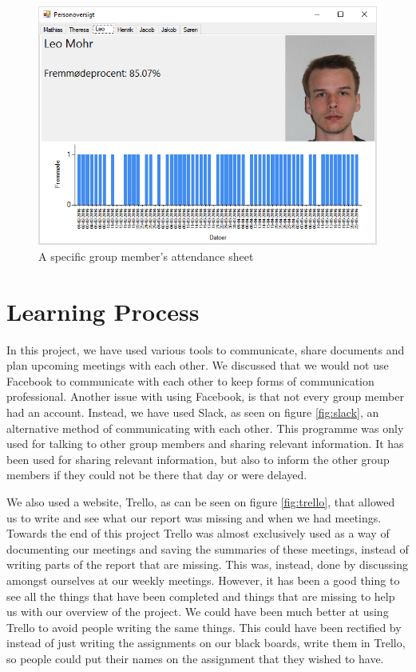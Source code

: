 \documentclass{article}
\begin{document}
\begin{figure}
	\centering
	\includegraphics[width=1\textwidth]{figures/soerenfravaer.png}
	\caption{A specific group member's attendance sheet}
	\label{fig:soerenfravaer}
\end{figure}

\section{Learning Process}
In this project, we have used various tools to communicate, share documents and plan upcoming meetings with each other. 
We discussed that we would not use Facebook to communicate with each other to keep forms of communication professional.
Another issue with using Facebook, is that not every group member had an account.
Instead, we have used Slack, as seen on figure \ref{fig:slack}, an alternative method of communicating with each other. 
This programme was only used for talking to other group members and sharing relevant information. 
It has been used for sharing relevant information, but also to inform the other group members if they could not be there that day or were delayed. 

We also used a website, Trello, as can be seen on figure \ref{fig:trello}, that allowed us to write and see what our report was missing and when we had meetings. 
Towards the end of this project Trello was almost exclusively used as a way of documenting our meetings and saving the summaries of these meetings, instead of writing parts of the report that are missing. 
This was, instead, done by discussing amongst ourselves at our weekly meetings.
However, it has been a good thing to see all the things that have been completed and things that are missing to help us with our overview of the project.
We could have been much better at using Trello to avoid people writing the same things.
This could have been rectified by instead of just writing the assignments on our black boards, write them in Trello, so people could put their names on the assignment that they wished to have.
\end{document}
